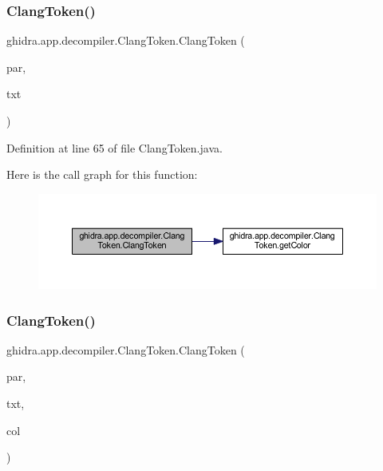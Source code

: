 \subsubsection{\texorpdfstring{ClangToken()}{ClangToken()}\hspace{0.1cm}{\footnotesize\ttfamily [2/3]}}
{\footnotesize\ttfamily ghidra.\+app.\+decompiler.\+Clang\+Token.\+Clang\+Token (\begin{DoxyParamCaption}\item[{\mbox{\hyperlink{interfaceghidra_1_1app_1_1decompiler_1_1_clang_node}{Clang\+Node}}}]{par,  }\item[{String}]{txt }\end{DoxyParamCaption})\hspace{0.3cm}{\ttfamily [inline]}}



Definition at line 65 of file Clang\+Token.\+java.

Here is the call graph for this function\+:
\nopagebreak
\begin{figure}[H]
\begin{center}
\leavevmode
\includegraphics[width=350pt]{classghidra_1_1app_1_1decompiler_1_1_clang_token_ad21f7bf2e47d465f0b37d2b6ae6ef146_cgraph}
\end{center}
\end{figure}
\mbox{\label{classghidra_1_1app_1_1decompiler_1_1_clang_token_ad16c38cbfedefe4f3542219501135b8d}} 
\subsubsection{\texorpdfstring{ClangToken()}{ClangToken()}\hspace{0.1cm}{\footnotesize\ttfamily [3/3]}}
{\footnotesize\ttfamily ghidra.\+app.\+decompiler.\+Clang\+Token.\+Clang\+Token (\begin{DoxyParamCaption}\item[{\mbox{\hyperlink{interfaceghidra_1_1app_1_1decompiler_1_1_clang_node}{Clang\+Node}}}]{par,  }\item[{String}]{txt,  }\item[{String}]{col }\end{DoxyParamCaption})\hspace{0.3cm}{\ttfamily [inline]}}



